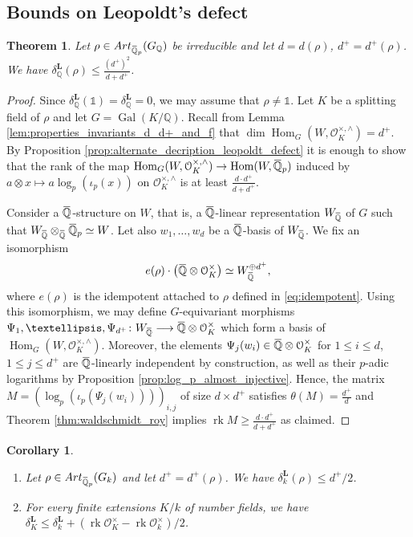 \documentclass[12pt]{amsart}
\newcommand{\Q}{\mathbb{Q}}
\newcommand\bQ{\mathbb{Q}}
\newcommand\cO{\mathcal{O}}
\newcommand{\ob}[1]{\mkern 1.5mu\overline{\mkern-1.5mu#1\mkern-1.5mu}\mkern 1.5mu}
\newcommand{\Art}{\textrm{Art}}
\DeclareMathOperator{\Gal}{Gal}
\DeclareMathOperator{\Hom}{Hom}
\DeclareMathOperator{\rk}{rk}
\theoremstyle{defstyle}
\theoremstyle{thmstyle}
\newtheorem{theorem}[subsubsection]{Theorem}
\newtheorem{corollaire}[subsubsection]{Corollary}
\begin{document}
	\subsection{Bounds on Leopoldt's defect}
	\begin{theorem}\label{thm:leopoldt_main}
		Let $\rho\in \Art_{\ob{\bQ}_p}(G_\Q)$ be irreducible and let $d=d(\rho)$, $d^+=d^+(\rho)$. We have $\delta^\textbf{L}_\bQ(\rho) \leq \frac{(d^+)^2}{d+d^+}$.
	\end{theorem}
	\begin{proof}
		Since $\delta_\Q^\textbf{L}(\mathds{1})=\delta_\Q^\textbf{L}=0$, we may assume that $\rho\neq \mathds{1}$. Let $K$ be a splitting field of $\rho$ and let $G=\Gal(K/\Q)$. Recall from Lemma \ref{lem:properties_invariants_d_d+_and_f} that $\dim \Hom_G(W,\cO_K^{\times,\wedge})=d^+$. By Proposition \ref{prop:alternate_decription_leopoldt_defect} it is enough to show that the rank of the map $\Hom_G(W,\cO_K^{\times,\wedge})\rightarrow \Hom(W,\ob{\Q}_p)$ induced by $a\otimes x \mapsto a\log_p(\iota_p(x))$ on $\cO_K^{\times,\wedge}$ is at least $\frac{d\cdot d^+}{d+d^+}$. 
		
		Consider a $\ob{\bQ}$-structure on $W$, that is, a $\ob{\Q}$-linear representation $W_{\ob{\Q}}$ of $G$ such that $W_{\ob{\Q}}\otimes_{\ob{\bQ}} \ob{\Q}_p \simeq W$. Let also $w_1,\ldots,w_d$ be a $\ob{\Q}$-basis of $W_{\ob{\bQ}}$. We fix an isomorphism 
		$$e(\rho) \cdot \left(\ob{\Q} \otimes \cO_K^\times\right) \simeq W_{\ob{\Q}}^{\oplus d^+},$$ 
		where $e(\rho)$ is the idempotent attached to $\rho$ defined in \eqref{eq:idempotent}. Using this isomorphism, we may define $G$-equivariant morphisms $\Psi_1,\ldots,\Psi_{d^+} \colon W_{\ob{\Q}} \longrightarrow \ob{\Q} \otimes \cO_K^\times$ which form a basis of $\Hom_G(W,\cO_K^{\times,\wedge})$. Moreover, the elements $\Psi_j(w_i) \in \ob{\bQ} \otimes \cO_K^\times$ for $1\leq i \leq d$, $1 \leq j \leq d^+$ are $\ob{\bQ}$-linearly independent by construction, as well as their $p$-adic logarithms by Proposition \ref{prop:log_p_almost_injective}. Hence, the matrix $M=(\log_p(\iota_p(\Psi_j(w_i))))_{i,j}$ of size $d\times d^+$ satisfies $\theta(M)=\frac{d^+}{d}$ and Theorem \ref{thm:waldschmidt_roy} implies $\rk M \geq \frac{d\cdot d^+}{d+d^+}$ as claimed.
	\end{proof}
	\begin{corollaire}\label{coro:waldschmidt_bound}
		\begin{enumerate}
			\item Let $\rho \in \Art_{\ob{\bQ}_p}(G_k)$ and let $d^+=d^+(\rho)$. We have $\delta_k^\textbf{L}(\rho) \leq d^+/2$. 
			\item For every finite extensions $K/k$ of number fields, we have $\delta^\textbf{L}_K \leq \delta^\textbf{L}_k + \left(\rk \cO_K^\times - \rk \cO_k^\times \right)/2$. 
		\end{enumerate} 
	\end{corollaire}
\end{document}
